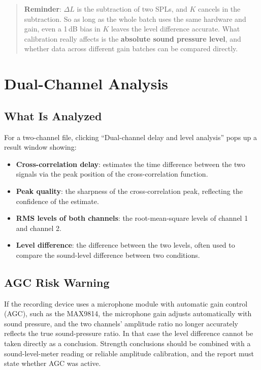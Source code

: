 \documentclass[UTF8,a4paper,12pt]{ctexart}
\begin{document}
\begin{quote}
\textbf{Reminder}: $\Delta L$ is the subtraction of two SPLs, and $K$ cancels in the subtraction. So as long as the whole batch uses the same hardware and gain, even a 1\,dB bias in $K$ leaves the level difference accurate. What calibration really affects is the \textbf{absolute sound pressure level}, and whether data across different gain batches can be compared directly.
\end{quote}

\section{Dual-Channel Analysis}

\subsection{What Is Analyzed}

For a two-channel file, clicking ``Dual-channel delay and level analysis'' pops up a result window showing:

\begin{itemize}
  \item \textbf{Cross-correlation delay}: estimates the time difference between the two signals via the peak position of the cross-correlation function.
  \item \textbf{Peak quality}: the sharpness of the cross-correlation peak, reflecting the confidence of the estimate.
  \item \textbf{RMS levels of both channels}: the root-mean-square levels of channel 1 and channel 2.
  \item \textbf{Level difference}: the difference between the two levels, often used to compare the sound-level difference between two conditions.
\end{itemize}

\subsection{AGC Risk Warning}

If the recording device uses a microphone module with automatic gain control (AGC), such as the MAX9814, the microphone gain adjusts automatically with sound pressure, and the two channels' amplitude ratio no longer accurately reflects the true sound-pressure ratio. In that case the level difference cannot be taken directly as a conclusion. Strength conclusions should be combined with a sound-level-meter reading or reliable amplitude calibration, and the report must state whether AGC was active.
\end{document}
